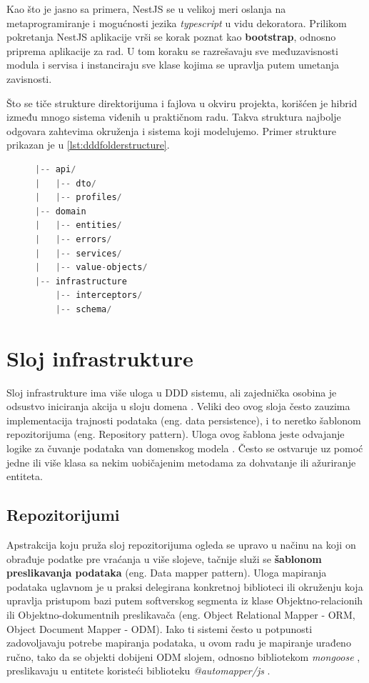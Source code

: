 \documentclass[12pt,oneside]{memoir}
\begin{document}
Kao što je jasno sa primera, NestJS se u velikoj meri oslanja na metaprogramiranje i mogućnosti jezika \textit{typescript} u vidu dekoratora. Prilikom pokretanja NestJS aplikacije vrši se korak poznat kao \textbf{bootstrap}, odnosno priprema aplikacije za rad. U tom koraku se razrešavaju sve međuzavisnosti modula i servisa i instanciraju sve klase kojima se upravlja putem umetanja zavisnosti.

Što se tiče strukture direktorijuma i fajlova u okviru projekta, korišćen je hibrid između mnogo sistema viđenih u praktičnom radu. Takva struktura najbolje odgovara zahtevima okruženja i sistema koji modelujemo. Primer strukture prikazan je u \ref{lst:dddfolderstructure}.

\begin{figure}[h]
\begin{lstlisting}[language=JavaScript, style=ES6, caption={fajl tickets.module.ts},label={lst:dddfolderstructure}]
|-- api/
|   |-- dto/
|   |-- profiles/
|-- domain
|   |-- entities/
|   |-- errors/
|   |-- services/
|   |-- value-objects/
|-- infrastructure
    |-- interceptors/
    |-- schema/
\end{lstlisting}
\end{figure}

\section{Sloj infrastrukture}

Sloj infrastrukture ima više uloga u DDD sistemu, ali zajednička osobina je odsustvo iniciranja akcija u sloju domena \cite{dddfull}. Veliki deo ovog sloja često zauzima implementacija trajnosti podataka (eng. data persistence), i to neretko šablonom repozitorijuma (eng. Repository pattern). Uloga ovog šablona jeste odvajanje logike za čuvanje podataka van domenskog modela \cite{msrepository}. Često se ostvaruje uz pomoć jedne ili više klasa sa nekim uobičajenim metodama za dohvatanje ili ažuriranje entiteta.


\subsection{Repozitorijumi}
Apstrakcija koju pruža sloj repozitorijuma ogleda se upravo u načinu na koji on obrađuje podatke pre vraćanja u više slojeve, tačnije služi se \textbf{šablonom preslikavanja podataka} (eng. Data mapper pattern). Uloga mapiranja podataka uglavnom je u praksi delegirana konkretnoj biblioteci ili okruženju koja upravlja pristupom bazi putem softverskog segmenta iz klase Objektno-relacionih ili Objektno-dokumentnih preslikavača (eng. Object Relational Mapper - ORM, Object Document Mapper - ODM). Iako ti sistemi često u potpunosti zadovoljavaju potrebe mapiranja podataka, u ovom radu je mapiranje urađeno ručno, tako da se objekti dobijeni ODM slojem, odnosno bibliotekom \textit{mongoose} \cite{mongoosedocs}, preslikavaju u entitete koristeći biblioteku \textit{@automapper/js} \cite{automapperjsdocs}.
\end{document}

